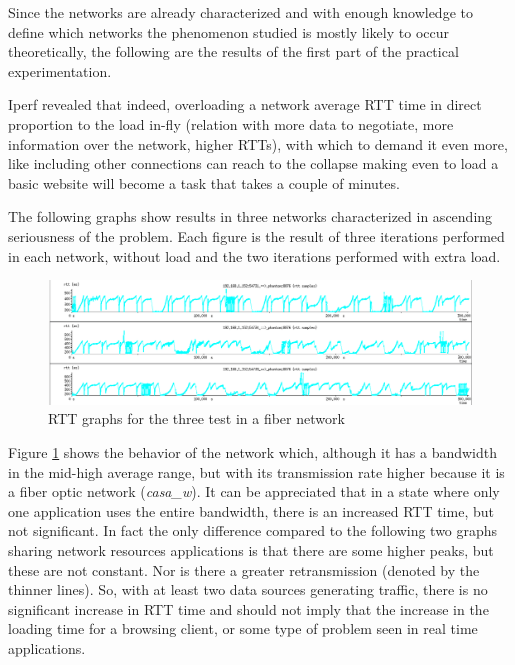 Since the networks are already characterized and with enough knowledge to
define which networks the phenomenon studied  is mostly likely to occur
theoretically, the following are the results of the first part of the
practical experimentation.

Iperf revealed that indeed, overloading a network average RTT time in direct
proportion to the load in-fly (relation with more data to negotiate, more
information over the network, higher RTTs), with which to demand it even more,
like including other connections can reach to the collapse making even to load
a basic website will become a task that takes a couple of minutes.

The following graphs show results in three networks characterized in ascending
seriousness of the problem. Each figure is the result of three iterations
performed in each network, without load and the two iterations performed with
extra load.

\begin{figure}[ht]
\centering
    \includegraphics[width=\textwidth]{img/n_iperf_good}
\caption[Iperf: RTT graphs for a fiber network]{RTT graphs for the three test in a fiber network}
\label{fig:iperfgood}
\end{figure}%

Figure \ref{fig:iperfgood} shows the behavior of the network which, although it
has a bandwidth in the mid-high average range, but with its transmission rate
higher because it is a fiber optic network (\emph{casa\_w}). It can be
appreciated that in a state where only one application uses the entire
bandwidth, there is an increased RTT time, but not significant. In fact the
only difference compared to the following two graphs sharing network resources
applications is that there are some higher peaks, but these are not constant.
Nor is there a greater retransmission (denoted by the thinner lines). So, with
at least two data sources generating traffic, there is no significant increase
in RTT time and should not imply that the increase in the loading time for a
browsing client, or some type of problem seen in real time applications.

